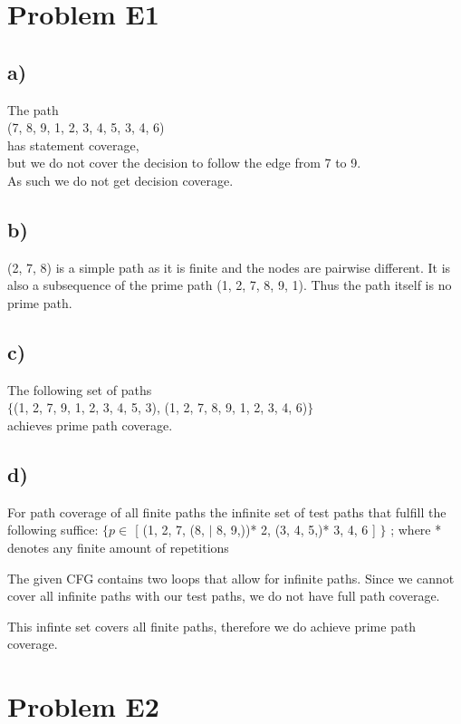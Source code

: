 \documentclass[12pt]{article}
\begin{document}
\lstset{language=C++}

\section*{Problem E1}
\subsection*{a)}
The path \\
(7, 8, 9, 1, 2, 3, 4, 5, 3, 4, 6) \\
has statement coverage, \\
but we do not cover the decision to follow the edge from 7 to 9. \\
As such we do not get decision coverage.

\subsection*{b)}
(2, 7, 8) is a simple path as it is finite and the nodes are pairwise different.
It is also a subsequence of the prime path (1, 2, 7, 8, 9, 1).
Thus the path itself is no prime path.

\subsection*{c)}
The following set of paths \\
$\{$(1, 2, 7, 9, 1, 2, 3, 4, 5, 3), (1, 2, 7, 8, 9, 1, 2, 3, 4, 6)$\}$ \\
achieves prime path coverage. 


\subsection*{d)}
For path coverage of all finite paths the infinite set of test paths that fulfill the following suffice:
$\{ p \in $ [ (1, 2, 7, (8, $|$ 8, 9,))* 2, (3, 4, 5,)* 3, 4, 6 ] $\}$ ; where * denotes any finite amount of repetitions

The given CFG contains two loops that allow for infinite paths.
Since we cannot cover all infinite paths with our test paths, we do not have full path coverage.

This infinte set covers all finite paths, therefore we do achieve prime path coverage. 
\section*{Problem E2}
\end{document}
